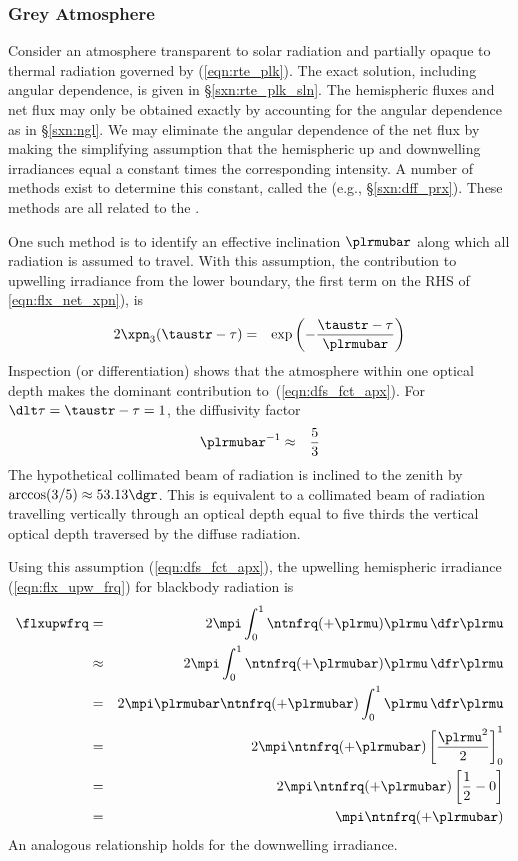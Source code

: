 \documentclass[12pt]{article}
\begin{document}
\subsubsection[Grey Atmosphere]{Grey Atmosphere}\label{sxn:gry}
Consider an atmosphere transparent to solar radiation and partially
opaque to thermal radiation governed by (\ref{eqn:rte_plk}).
The exact solution, including angular dependence, is given in
\S\ref{sxn:rte_plk_sln}.
The hemispheric fluxes and net flux may only be obtained exactly by
accounting for the angular dependence as in \S\ref{sxn:ngl}.
We may eliminate the angular dependence of the net flux by making the
simplifying assumption that the hemispheric up and downwelling
irradiances equal a constant times the corresponding intensity. 
A number of methods exist to determine this constant, called the 
 (e.g., \S\ref{sxn:dff_prx}).
These methods are all related to the .

One such method \cite[][p.~232]{Sal96} is to identify an effective
inclination $\plrmubar$ along which all radiation is assumed to
travel.
With this assumption, the contribution to upwelling irradiance from
the lower boundary, the first term on the RHS of \ref{eqn:flx_net_xpn}), is
\begin{eqnarray}
2 \xpn_{3}(\taustr - \tau) & = & 
\exp \left( -\frac{\taustr - \tau}{\plrmubar} \right)
\label{eqn:dfs_fct_apx}
\end{eqnarray}
Inspection (or differentiation) shows that the atmosphere within one
optical depth makes the dominant contribution to~(\ref{eqn:dfs_fct_apx}).
For $\dlt\tau = \taustr - \tau = 1$, the diffusivity factor 
\begin{eqnarray}
\plrmubar^{-1} & \approx & \frac{5}{3}
\label{eqn:plr_mu_bar_dfn}
\end{eqnarray}
The hypothetical collimated beam of radiation is inclined to the zenith
by $\arccos(3/5) \approx 53.13\dgr$.
This is equivalent to a collimated beam of radiation travelling
vertically through an optical depth equal to five thirds the vertical
optical depth traversed by the diffuse radiation. 

Using this assumption (\ref{eqn:dfs_fct_apx}), the upwelling
hemispheric irradiance (\ref{eqn:flx_upw_frq}) for blackbody radiation is
\begin{eqnarray}
\flxupwfrq & = & 
2 \mpi \int_{0}^{1} \ntnfrq (+\plrmu) \plrmu \, \dfr\plrmu \nonumber \\
& \approx & 2 \mpi \int_{0}^{1} \ntnfrq (+\plrmubar) \plrmu \, \dfr\plrmu \nonumber \\
& = & 2 \mpi \plrmubar \ntnfrq(+\plrmubar) \int_{0}^{1} \plrmu \, \dfr\plrmu \nonumber \\
& = & 2 \mpi \ntnfrq (+\plrmubar) \left[ \frac{\plrmu^{2}}{2} \right]_{0}^{1} \nonumber \\
& = & 2 \mpi \ntnfrq (+\plrmubar) \left[ \frac{1}{2} - 0 \right] \nonumber \\
& = & \mpi \ntnfrq (+\plrmubar) \nonumber \\
\label{eqn:flx_ntn_apx}
\end{eqnarray}
An analogous relationship holds for the downwelling irradiance.
\end{document}
